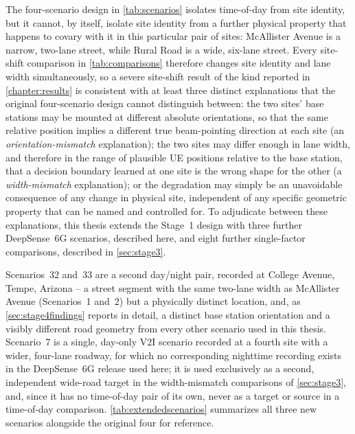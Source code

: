 \documentclass{iutbscthesis}
\begin{document}
The four-scenario design in \autoref{tab:scenarios} isolates time-of-day from site identity, but it cannot, by itself, isolate site identity from a further physical property that happens to covary with it in this particular pair of sites: McAllister Avenue is a narrow, two-lane street, while Rural Road is a wide, six-lane street. Every site-shift comparison in \autoref{tab:comparisons} therefore changes site identity and lane width simultaneously, so a severe site-shift result of the kind reported in \autoref{chapter:results} is consistent with at least three distinct explanations that the original four-scenario design cannot distinguish between: the two sites' base stations may be mounted at different absolute orientations, so that the same relative position implies a different true beam-pointing direction at each site (an \emph{orientation-mismatch} explanation); the two sites may differ enough in lane width, and therefore in the range of plausible UE positions relative to the base station, that a decision boundary learned at one site is the wrong shape for the other (a \emph{width-mismatch} explanation); or the degradation may simply be an unavoidable consequence of any change in physical site, independent of any specific geometric property that can be named and controlled for. To adjudicate between these explanations, this thesis extends the Stage~1 design with three further DeepSense~6G scenarios, described here, and eight further single-factor comparisons, described in \autoref{sec:stage3}.

Scenarios~32 and~33 are a second day/night pair, recorded at College Avenue, Tempe, Arizona -- a street segment with the same two-lane width as McAllister Avenue (Scenarios~1 and~2) but a physically distinct location, and, as \autoref{sec:stage4findings} reports in detail, a distinct base station orientation and a visibly different road geometry from every other scenario used in this thesis. Scenario~7 is a single, day-only V2I scenario recorded at a fourth site with a wider, four-lane roadway, for which no corresponding nighttime recording exists in the DeepSense~6G release used here; it is used exclusively as a second, independent wide-road target in the width-mismatch comparisons of \autoref{sec:stage3}, and, since it has no time-of-day pair of its own, never as a target or source in a time-of-day comparison. \autoref{tab:extendedscenarios} summarizes all three new scenarios alongside the original four for reference.
\end{document}
